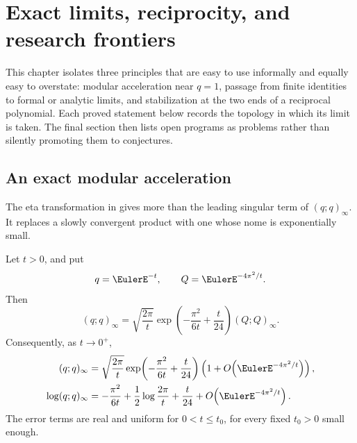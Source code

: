 \chapter{Exact limits, reciprocity, and research frontiers}\label{chap:limits-reciprocity-frontiers}

This chapter isolates three principles that are easy to use informally and
equally easy to overstate: modular acceleration near \(q=1\), passage from
finite identities to formal or analytic limits, and stabilization at the two
ends of a reciprocal polynomial.  Each proved statement below records the
topology in which its limit is taken.  The final section then lists open
programs as problems rather than silently promoting them to conjectures.

\section{An exact modular acceleration}

The eta transformation in  gives more than the
leading singular term of \((q;q)_\infty\).  It replaces a slowly convergent
product with one whose nome is exponentially small.

\begin{theorem}
\label{qg:thm-qpochhammer-modular-asymptotic}
Let \(t>0\), and put
\[
 q=\EulerE^{-t},
 \qquad
 Q=\EulerE^{-4\pi^2/t}.
\]
Then
\begin{equation}
 (q;q)_\infty
 =\sqrt{\frac{2\pi}{t}}
   \exp\!\left(-\frac{\pi^2}{6t}+\frac{t}{24}\right)
   (Q;Q)_\infty.
\label{eq:qg-qpochhammer-modular-exact}
\end{equation}
Consequently, as \(t\to0^+\),
\begin{align}
 (q;q)_\infty
 &=\sqrt{\frac{2\pi}{t}}
   \exp\!\left(-\frac{\pi^2}{6t}+\frac{t}{24}\right)
   \left(1+O\!\left(\EulerE^{-4\pi^2/t}\right)\right),
\label{eq:qg-qpochhammer-modular-asymptotic}\\
 \log(q;q)_\infty
 &=-\frac{\pi^2}{6t}
   +\frac12\log\frac{2\pi}{t}
   +\frac{t}{24}
   +O\!\left(\EulerE^{-4\pi^2/t}\right).
\label{eq:qg-qpochhammer-log-asymptotic}
\end{align}
The error terms are real and uniform for \(0<t\le t_0\), for every fixed
\(t_0>0\) small enough.
\end{theorem}

